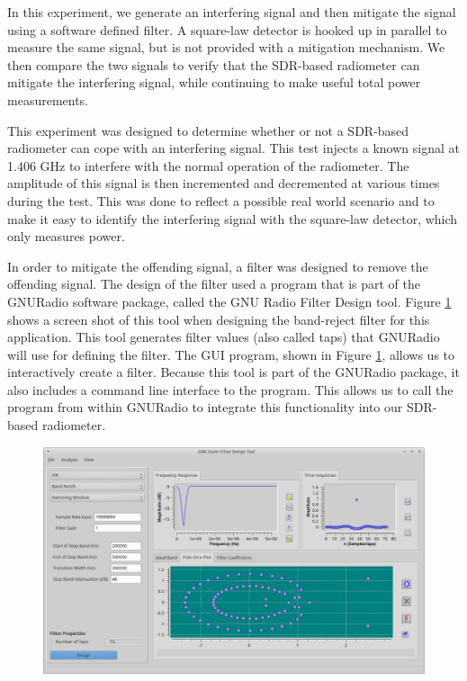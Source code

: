 In this experiment, we generate an interfering signal and then mitigate the signal using a software defined filter.  A square-law detector is hooked up in parallel to measure the same signal, but is not provided with a mitigation mechanism.  We then compare the two signals to verify that the SDR-based radiometer can mitigate the interfering signal, while continuing to make useful total power measurements.

This experiment was designed to determine whether or not a SDR-based radiometer can cope with an interfering signal.  This test injects a known signal at 1.406 GHz to interfere with the normal operation of the radiometer.  The amplitude of this signal is then incremented and decremented at various times during the test.  This was done to reflect a possible real world scenario and to make it easy to identify the interfering signal with the square-law detector, which only measures power.  

In order to mitigate the offending signal, a filter was designed to remove the offending signal.  The design of the filter used a program that is part of the GNURadio software package, called the GNU Radio Filter Design tool.  Figure \ref{GRC_Filter_DSN} shows a screen shot of this tool when designing the band-reject filter for this application.  This tool generates filter values (also called taps) that GNURadio will use for defining the filter.  The GUI program, shown in Figure \ref{GRC_Filter_DSN}, allows us to interactively create a filter.  Because this tool is part of the GNURadio package, it also includes a command line interface to the program.  This allows us to call the program from within GNURadio to integrate this functionality into our SDR-based radiometer.  

\begin{figure}[h!tb] \centering
\includegraphics[width=\textwidth]{Images/GNURadio_Filter_dsn.png}
\label{GRC_Filter_DSN}
\end{figure}  

